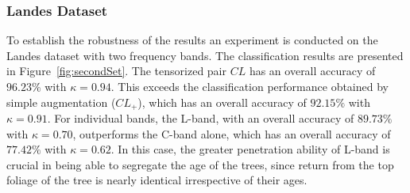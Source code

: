 
\subsubsection{Landes Dataset}
To establish the robustness of the results an experiment is conducted on the Landes dataset with two frequency bands. The classification results are presented in Figure~\ref{fig:secondSet}. 
The tensorized pair $CL$ has an overall accuracy of $96.23\%$ with $\kappa=0.94$. This exceeds the classification performance obtained by simple augmentation ($CL_+$), which has an overall accuracy of $92.15\%$ with $\kappa=0.91$. For individual bands, the L-band, with an overall accuracy of  $89.73\%$ with $\kappa=0.70$, outperforms the C-band alone, which has an overall accuracy of  $77.42\%$ with $\kappa=0.62$. In this case, the greater penetration ability of L-band is crucial in being able to segregate the age of the trees, since return from the top foliage of the tree is nearly identical irrespective of their ages. 

